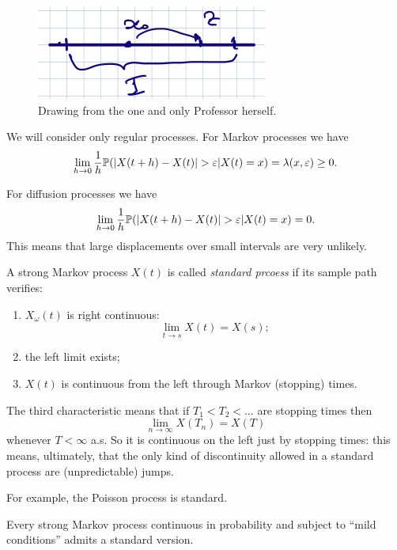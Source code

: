 \documentclass[12pt]{report}
\begin{document}
\begin{figure}[H]
	\centering
	\includegraphics[width=0.5\linewidth]{img/screenshot047}
	\caption{Drawing from the one and only Professor herself.}
	\label{fig:screenshot047}
\end{figure}
We will consider only regular processes. For Markov processes we have
\begin{equation*}
	\lim_{h\to0}\frac{1}{h}\pr(|X(t+h)-X(t)|>\varepsilon|X(t)=x)=\lambda(x,\varepsilon)\geq0.
\end{equation*}
\begin{remark}
	For diffusion processes we have
	\begin{equation*}
		\lim_{h\to0}\frac{1}{h}\pr(|X(t+h)-X(t)|>\varepsilon|X(t)=x)=0.
	\end{equation*}
	This means that large displacements over small intervals are very unlikely.
\end{remark}\begin{definition}
A strong Markov process ${X(t)}$ is called \emph{standard prcoess} if its sample path verifies:
\begin{enumerate}
	\item $X_{\omega}(t)$ is right continuous:
	\begin{equation*}
		\lim_{t\to s}X(t)=X(s);
	\end{equation*}
	\item the left limit exists;
	\item $X(t)$ is continuous from the left through Markov (stopping) times. 
\end{enumerate}
\end{definition}
The third characteristic means that if $T_{1}<T_{2}<\ldots$ are stopping times then
\begin{equation*}
	\lim_{n\to\infty}X(T_{n})=X(T)
\end{equation*}
whenever $T<\infty$ a.s. So it is continuous on the left just by stopping times: this means, ultimately, that the only kind of discontinuity allowed in a standard process are (unpredictable) jumps.\par
For example, the Poisson process is standard.
\begin{proposition}
	Every strong Markov process continuous in probability and subject to ``mild conditions'' admits a standard version.
\end{proposition}
\end{document}
